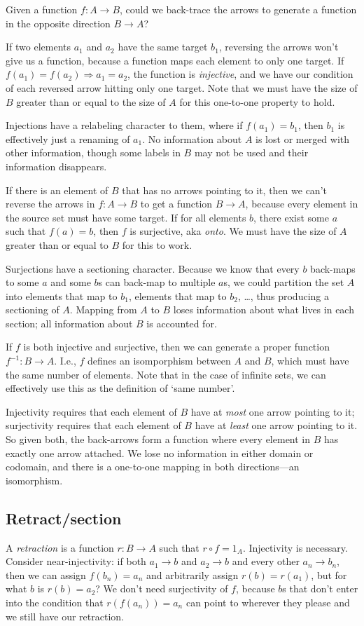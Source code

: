 \documentclass[11pt]{article}
\begin{document}
Given a function $f:A\to B$, could we back-trace the arrows to generate a function in the opposite direction $B\to A$?

If two elements $a_1$ and $a_2$ have the same target $b_1$, reversing the arrows
won't give us a function, because a function maps each element to only one target.
If $f(a_1)=f(a_2) \Rightarrow a_1=a_2$, the function is {\em injective}, and we have our
condition of each reversed arrow hitting only one target. Note that we must have the size
of $B$ greater than or equal to the size of $A$ for this one-to-one property to hold.

Injections have a relabeling character to them, where if $f(a_1)=b_1$, then $b_1$ is
effectively just a renaming of $a_1$. No information about $A$ is lost or merged with
other information, though some labels in $B$ may not be used and their information
disappears.

If there is an element of $B$ that has no arrows pointing to it, then we can't reverse the
arrows in $f:A\to B$ to get a function $B\to A$, because every element in the source set
must have some target. If for all elements $b$, there exist some $a$ such that $f(a)=b$,
then $f$ is surjective, aka {\em onto}. We must have the size of $A$ greater than or equal
to $B$ for this to work.

Surjections have a sectioning character.  Because we know that every $b$ back-maps to some $a$ and some $b$s
can back-map to multiple $a$s, we could partition the set $A$ into elements that map to $b_1$,
elements that map to $b_2$, \dots, thus producing a sectioning of $A$. Mapping from $A$ to
$B$ loses information about what lives in each section; all information about $B$ is
accounted for.

If $f$ is both injective and surjective, then we can generate a proper function
$f^{-1}:B\to A$. I.e., $f$ defines an isomporphism between $A$ and $B$, which must have
the same number of elements. Note that in the case of infinite sets, we can effectively
use this as the definition of `same number'.

Injectivity requires that each element of $B$ have at {\em most} one arrow pointing
to it; surjectivity requires that each element of $B$ have at {\em least} one arrow
pointing to it.  So given both, the back-arrows form a function where every element in
$B$ has exactly one arrow attached. We lose no information in either domain or codomain,
and there is a one-to-one mapping in both directions---an isomorphism.

\subsection{Retract/section}
A {\em retraction} is a function $r:B\to A$ such that $r\circ f=1_A$. Injectivity is
necessary. Consider near-injectivity: if both $a_1\to b$ and $a_2\to b$ and every other
$a_n\to b_n$, then we can assign $f(b_n)=a_n$ and arbitrarily assign $r(b)=r(a_1)$,
but for what $b$ is $r(b)=a_2$?  We don't need surjectivity of $f$, because $b$s that
don't enter into the condition that $r(f(a_n))=a_n$ can point to wherever they please
and we still have our retraction.
\end{document}
